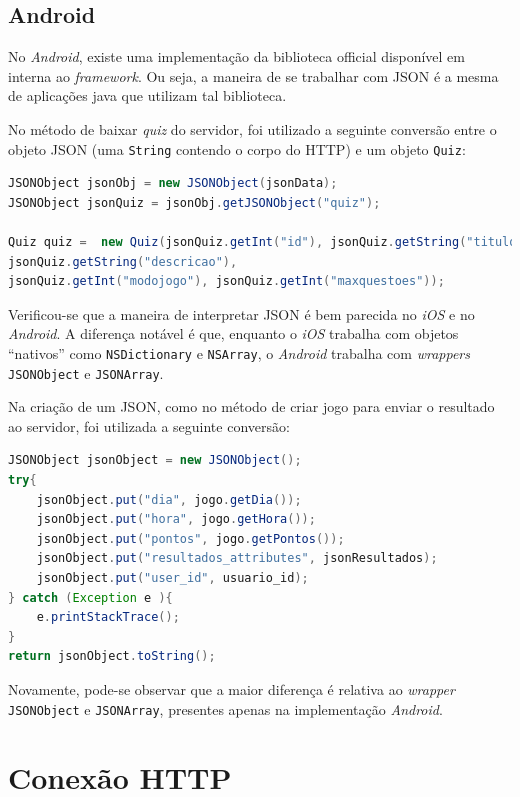     \subsection{Android}
     
            No \emph{Android}, existe uma implementação da biblioteca official disponível em \cite{json} interna ao \emph{framework}. Ou seja, a maneira de se trabalhar com \ac{JSON} é a mesma de aplicações java que utilizam tal biblioteca.
           
		    No método de baixar \emph{quiz} do servidor, foi utilizado a seguinte conversão entre o objeto \ac{JSON} (uma \texttt{String} contendo o corpo do \ac{HTTP}) e um objeto \texttt{Quiz}:
\begin{lstlisting}[language=Java]   
JSONObject jsonObj = new JSONObject(jsonData);
JSONObject jsonQuiz = jsonObj.getJSONObject("quiz");
                   
Quiz quiz =  new Quiz(jsonQuiz.getInt("id"), jsonQuiz.getString("titulo"),
jsonQuiz.getString("descricao"), 
jsonQuiz.getInt("modojogo"), jsonQuiz.getInt("maxquestoes"));
 \end{lstlisting}             
 
    Verificou-se que a maneira de interpretar \ac{JSON} é bem parecida no \emph{iOS} e no \emph{Android}. A diferença notável é que, enquanto o \emph{iOS} trabalha com objetos ``nativos'' como \texttt{NSDictionary} e \texttt{NSArray}, o \emph{Android} trabalha com \emph{wrappers} \texttt{JSONObject} e \texttt{JSONArray}.
   
    Na criação de um \ac{JSON}, como no método de criar jogo para enviar o resultado ao servidor, foi utilizada a seguinte conversão:
\begin{lstlisting}[language=Java]     
JSONObject jsonObject = new JSONObject();
try{
    jsonObject.put("dia", jogo.getDia());
    jsonObject.put("hora", jogo.getHora());
    jsonObject.put("pontos", jogo.getPontos());
    jsonObject.put("resultados_attributes", jsonResultados);
    jsonObject.put("user_id", usuario_id);
} catch (Exception e ){
    e.printStackTrace();
}
return jsonObject.toString();
\end{lstlisting}   
            
			Novamente, pode-se observar que a maior diferença é relativa ao \emph{wrapper} \texttt{JSONObject} e \texttt{JSONArray}, presentes apenas na implementação \emph{Android}.
     
    \section {Conexão HTTP}
     
